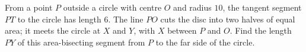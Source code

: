 From a point $P$ outside a circle with centre $O$ and radius $10$, the tangent segment $PT$ to the circle has length $6$. The line $PO$ cuts the disc into two halves of equal area; it meets the circle at $X$ and $Y$, with $X$ between $P$ and $O$. Find the length $PY$ of this area-bisecting segment from $P$ to the far side of the circle.
